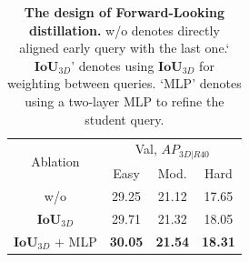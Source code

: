 \begin{table}[h!]
    \centering
        \caption{\textbf{The design of Forward-Looking distillation.} w/o denotes directly aligned early query with the last one.`$\mathbf{IoU}_{3D}$' denotes using $\mathbf{IoU}_{3D}$ for weighting between queries. `MLP' denotes using a two-layer MLP to refine the student query.} 
    \begin{tabular}{c|ccc}
         \toprule
         \multirow{2}{*}{Ablation} & \multicolumn{3}{c}{Val, $AP_{3D|R40}$} \\
          & Easy & Mod. & Hard \\ \midrule \midrule
         w/o &  29.25 & 21.12 & 17.65 \\
         $\mathbf{IoU}_{3D}$ & 29.71 & 21.32 & 18.05\\
         $\mathbf{IoU}_{3D}$ + MLP & \textbf{30.05} & \textbf{21.54} & \textbf{18.31} \\
         \bottomrule
    \end{tabular}
    \label{tab:self_distillation}
\end{table}